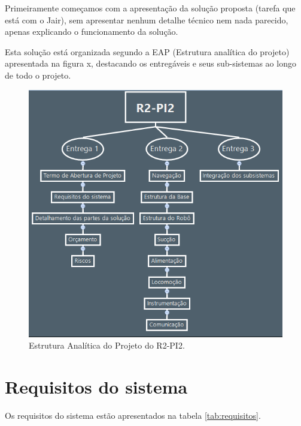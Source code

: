 Primeiramente começamos com a apresentação da solução proposta (tarefa que está com o Jair), sem apresentar nenhum detalhe técnico nem nada parecido, apenas explicando o funcionamento da solução. 

Esta solução está organizada segundo a EAP (Estrutura analítica do projeto) apresentada na figura x, destacando os entregáveis e seus sub-sistemas ao longo de todo o projeto.

\begin{figure}[H]
	\centering
	\includegraphics[scale=0.55]{figuras/eap.png}
	\caption{Estrutura Analítica do Projeto do R2-PI2.}
	\label{img:eap}
\end{figure}

\section{Requisitos do sistema} %
\label{sub:requisitos_do_sistema}

Os requisitos do sistema estão apresentados na tabela \ref{tab:requisitos}.

